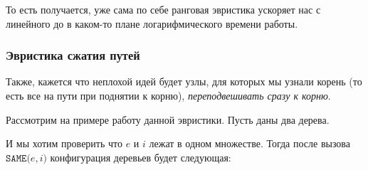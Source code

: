То есть получается, уже сама по себе ранговая эвристика ускоряет нас с линейного до в каком-то плане логарифмического времени работы.

\subsubsection{Эвристика сжатия путей}

Также, кажется что неплохой идей будет узлы, для которых мы узнали корень (то есть все на пути при поднятии к корню), \textit{переподвешивать сразу к корню}.

Рассмотрим на примере работу данной эвристики. Пусть даны два дерева.

\begin{figure}[H]
    \centering
\end{figure}

И мы хотим проверить что $e$ и $i$ лежат в одном множестве. Тогда после вызова $\texttt{SAME(}e, i\texttt{)}$ конфигурация деревьев будет следующая:

